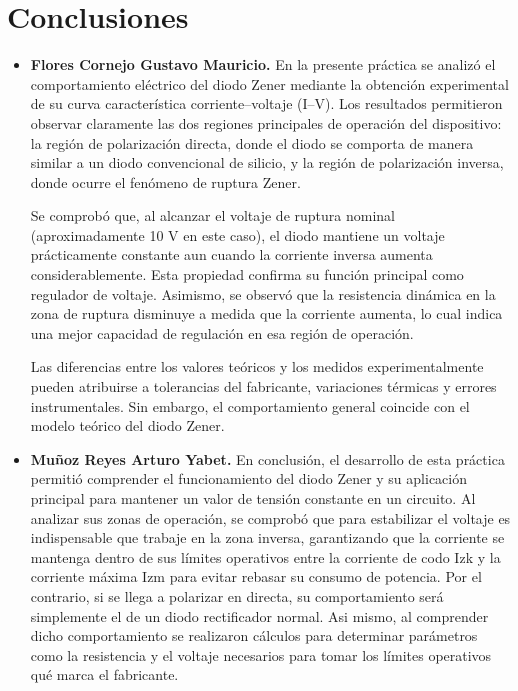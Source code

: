 \documentclass[journal]{IEEEtran}
\begin{document}
\section{Conclusiones}
\begin{itemize}
    \item \textbf{Flores Cornejo Gustavo Mauricio.}
    \newline En la presente práctica se analizó el comportamiento eléctrico del diodo Zener mediante la obtención experimental de su curva característica corriente–voltaje (I–V). Los resultados permitieron observar claramente las dos regiones principales de operación del dispositivo: la región de polarización directa, donde el diodo se comporta de manera similar a un diodo convencional de silicio, y la región de polarización inversa, donde ocurre el fenómeno de ruptura Zener.

Se comprobó que, al alcanzar el voltaje de ruptura nominal (aproximadamente 10 V en este caso), el diodo mantiene un voltaje prácticamente constante aun cuando la corriente inversa aumenta considerablemente. Esta propiedad confirma su función principal como regulador de voltaje. Asimismo, se observó que la resistencia dinámica en la zona de ruptura disminuye a medida que la corriente aumenta, lo cual indica una mejor capacidad de regulación en esa región de operación.

Las diferencias entre los valores teóricos y los medidos experimentalmente pueden atribuirse a tolerancias del fabricante, variaciones térmicas y errores instrumentales. Sin embargo, el comportamiento general coincide con el modelo teórico del diodo Zener.
    \item \textbf{Muñoz Reyes Arturo Yabet.}
    \newline En conclusión, el desarrollo de esta práctica permitió comprender el funcionamiento del diodo Zener y su aplicación principal para mantener un valor de tensión constante en un circuito. Al analizar sus zonas de operación, 
    se comprobó que para estabilizar el voltaje es indispensable que trabaje en la zona inversa, garantizando que la corriente se mantenga dentro de sus límites operativos entre la corriente de codo Izk y 
    la corriente máxima Izm para evitar rebasar su consumo de potencia. Por el contrario, si se llega a polarizar en directa, su comportamiento será simplemente el de un diodo rectificador normal. Asi mismo, 
    al comprender dicho comportamiento se realizaron cálculos para determinar parámetros como la resistencia y el voltaje necesarios para tomar los límites operativos qué marca el fabricante.


\end{itemize}
\end{document}
